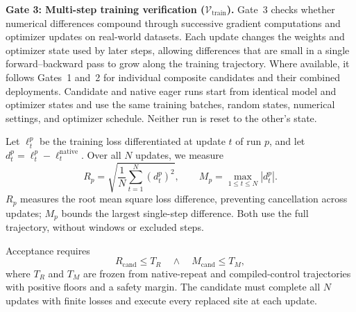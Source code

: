 \noindent\textbf{Gate 3: Multi-step training verification ($\mathcal{V}_{\mathrm{train}}$).}
Gate~3 checks whether numerical differences compound through successive gradient computations and optimizer updates on real-world datasets. Each update changes the weights and optimizer state used by later steps, allowing differences that are small in a single forward--backward pass to grow along the training trajectory. Where available, it follows Gates~1 and~2 for individual composite candidates and their combined deployments. Candidate and native eager runs start from identical model and optimizer states and use the same training batches, random states, numerical settings, and optimizer schedule. Neither run is reset to the other's state.

Let $\ell_t^p$ be the training loss differentiated at update $t$ of run $p$, and let $d_t^p=\ell_t^p-\ell_t^{\mathrm{native}}$. Over all $N$ updates, we measure
\begin{equation}
R_p=\sqrt{\frac{1}{N}\sum_{t=1}^{N}(d_t^p)^2},
\qquad
M_p=\max_{1\leq t\leq N}|d_t^p|.
\label{eq:training_errors}
\end{equation}
$R_p$ measures the root mean square loss difference, preventing cancellation across updates; $M_p$ bounds the largest single-step difference. Both use the full trajectory, without windows or excluded steps.

Acceptance requires
\begin{equation}
R_{\mathrm{cand}}\leq T_R
\quad\land\quad
M_{\mathrm{cand}}\leq T_M,
\label{eq:training_acceptance}
\end{equation}
where $T_R$ and $T_M$ are frozen from native-repeat and compiled-control trajectories with positive floors and a safety margin. The candidate must complete all $N$ updates with finite losses and execute every replaced site at each update.



